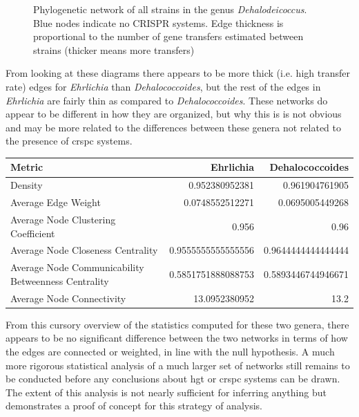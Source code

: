 \documentclass[12pt,letter]{article}
\begin{document}
\begin{figure}[htb!]
    \caption{Phylogenetic network of all strains in the genus \textit{Dehalodeicoccus}. Blue nodes indicate no CRISPR systems. Edge thickness is proportional to the number of gene transfers estimated between strains (thicker means more transfers)}
\end{figure}
\FloatBarrier
From looking at these diagrams there appears to be more thick (i.e. high transfer rate) edges for \textit{Ehrlichia} than \textit{Dehalococcoides}, but the rest of the edges in \textit{Ehrlichia} are fairly thin as compared to \textit{Dehalococcoides}.
These networks do appear to be different in how they are organized, but why this is is not obvious and may be more related to the differences between these genera not related to the presence of \ac{crspc} systems.
\begin{center}
    \begin{tabular}{l|r r}
        Metric & Ehrlichia & Dehalococcoides\\
        \hline
        Density & 0.952380952381&0.961904761905\\
        Average Edge Weight & 0.0748552512271&0.0695005449268\\
        Average Node Clustering Coefficient & 0.956&0.96\\
        Average Node Closeness Centrality & 0.9555555555555556&0.9644444444444444\\
        Average Node Communicability Betweenness Centrality & 0.5851751888088753 &0.5893446744946671\\
        Average Node Connectivity & 13.0952380952 & 13.2\\
    \end{tabular}
\end{center}
From this cursory overview of the statistics computed for these two genera, there appears to be no significant difference between  the two networks in terms of how the edges are connected or weighted, in line with the null hypothesis.
A much more rigorous statistical analysis of a much larger set of networks still remains to be conducted before any conclusions about \ac{hgt} or \ac{crspc} systems can be drawn.
The extent of this analysis is not nearly sufficient for inferring anything but demonstrates a proof of concept for this strategy of analysis.
\end{document}
